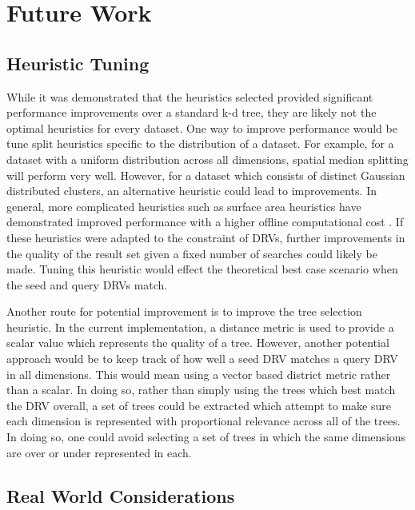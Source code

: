 \chapter{Future Work} %

\label{futurework} %


\section{Heuristic Tuning}

While it was demonstrated that the heuristics selected provided significant performance improvements over a standard k-d tree, they are likely not the optimal heuristics for every dataset.  One way to improve performance would be tune split heuristics specific to the distribution of a dataset.  For example, for a dataset with a uniform distribution across all dimensions, spatial median splitting will perform very well.  However, for a dataset which consists of distinct Gaussian distributed clusters, an alternative heuristic could lead to improvements.  In general, more complicated heuristics such as surface area heuristics have demonstrated improved performance with a higher offline computational cost \citep{hunt2006fast}.  If these heuristics were adapted to the constraint of DRVs, further improvements in the quality of the result set given a fixed number of searches could likely be made.  Tuning this heuristic would effect the theoretical best case scenario when the seed and query DRVs match.

Another route for potential improvement is to improve the tree selection heuristic.  In the current implementation, a distance metric is used to provide a scalar value which represents the quality of a tree.  However, another potential approach would be to keep track of how well a seed DRV matches a query DRV in all dimensions.  This would mean using a vector based district metric rather than a scalar.  In doing so, rather than simply using the trees which best match the DRV overall, a set of trees could be extracted which attempt to make sure each dimension is represented with proportional relevance across all of the trees. In doing so, one could avoid selecting a set of trees in which the same dimensions are over or under represented in each.

\section{Real World Considerations}
\label{sec:realworld}

